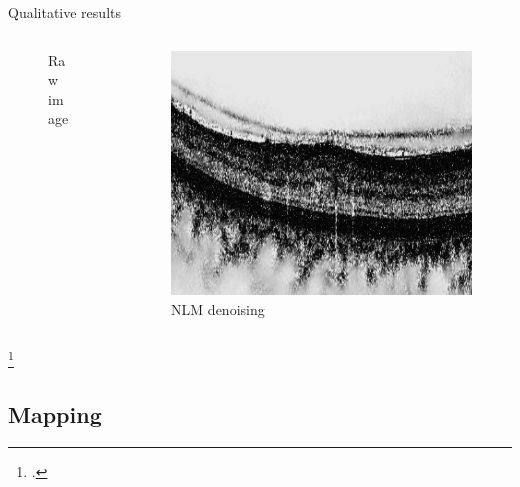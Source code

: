 \documentclass{beamer}
\begin{document}
\begin{frame}
\begin{block}{Qualitative results}
\begin{columns}
\begin{column}{.5\linewidth}
\begin{figure}
          \caption{Raw image}
        \end{figure}
      \end{column}
      \begin{column}{.5\linewidth}
        \begin{figure}
          \centering
          \includegraphics[width=.4\textwidth]{./images/nlm_crop_grey.png}
          \caption{NLM denoising}
        \end{figure}
      \end{column}
    \end{columns}
  \end{block}
  \footcitetext{Coupe2009}
\end{frame}

\subsection{Mapping}
\end{document}
